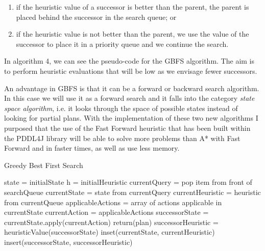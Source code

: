 \begin{enumerate}
\item if the heuristic value of a successor is better than the parent, the parent is placed behind the successor in the search queue; or
\item if the heuristic value is not better than the parent, we use the value of the successor to place it in a priority queue and we continue the search.  
\end{enumerate}

In algorithm 4, we can see the pseudo-code for the GBFS algorithm. The aim is to perform heuristic evaluations that will be low as we envisage fewer successors.\cite{GreedyOnline}

An advantage in GBFS is that it can be a forward or backward search algorithm. In this case we will use it as a forward search and it falls into the category \textit{state space algorithm}, i.e. it looks through the space of possible states instead of looking for partial plans. With the implementation of these two new algorithms I purposed that the use of the Fast Forward heuristic that has been built within the PDDL4J library will be able to solve more problems than A* with Fast Forward and in faster times, as well as use less memory.
 
\begin{algorithm}
\caption{Greedy Best First Search}
\begin{algorithmic}
\State state = initialState 
\State h = initialHeuristic
\State currentQuery = pop item from front of searchQueue
\State currentState = state from currentQuery
\State currentHeuristic = heuristic from currentQueue
\State applicableActions = array of actions applicable in currentState
\State currentAction = applicableActions
\State successorState = currentState.apply(currentAction)
\State return(plan)
\EndIf
\State successorHeuristic = heuristicValue(successorState)
\State inset(currentState, currentHeuristic) 
\State insert(successorState, successorHeuristic)
\EndIf
\EndFor
\EndWhile
\end{algorithmic}
\end{algorithm}
\clearpage
